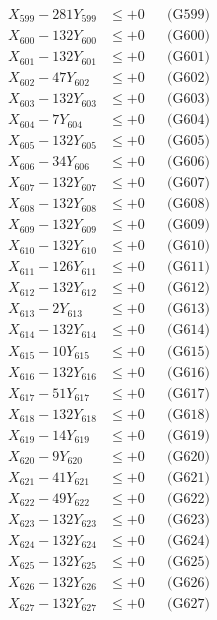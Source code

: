 \documentclass[a4paper,10pt]{article}
\begin{document}
{\begin{align}
X_{599} - 281Y_{599} &\leq +0 && \text{(G599)} \\
X_{600} - 132Y_{600} &\leq +0 && \text{(G600)} \\
\allowbreak
X_{601} - 132Y_{601} &\leq +0 && \text{(G601)} \\
X_{602} - 47Y_{602} &\leq +0 && \text{(G602)} \\
X_{603} - 132Y_{603} &\leq +0 && \text{(G603)} \\
X_{604} - 7Y_{604} &\leq +0 && \text{(G604)} \\
X_{605} - 132Y_{605} &\leq +0 && \text{(G605)} \\
X_{606} - 34Y_{606} &\leq +0 && \text{(G606)} \\
X_{607} - 132Y_{607} &\leq +0 && \text{(G607)} \\
X_{608} - 132Y_{608} &\leq +0 && \text{(G608)} \\
X_{609} - 132Y_{609} &\leq +0 && \text{(G609)} \\
X_{610} - 132Y_{610} &\leq +0 && \text{(G610)} \\
\allowbreak
X_{611} - 126Y_{611} &\leq +0 && \text{(G611)} \\
X_{612} - 132Y_{612} &\leq +0 && \text{(G612)} \\
X_{613} - 2Y_{613} &\leq +0 && \text{(G613)} \\
X_{614} - 132Y_{614} &\leq +0 && \text{(G614)} \\
X_{615} - 10Y_{615} &\leq +0 && \text{(G615)} \\
X_{616} - 132Y_{616} &\leq +0 && \text{(G616)} \\
X_{617} - 51Y_{617} &\leq +0 && \text{(G617)} \\
X_{618} - 132Y_{618} &\leq +0 && \text{(G618)} \\
X_{619} - 14Y_{619} &\leq +0 && \text{(G619)} \\
X_{620} - 9Y_{620} &\leq +0 && \text{(G620)} \\
\allowbreak
X_{621} - 41Y_{621} &\leq +0 && \text{(G621)} \\
X_{622} - 49Y_{622} &\leq +0 && \text{(G622)} \\
X_{623} - 132Y_{623} &\leq +0 && \text{(G623)} \\
X_{624} - 132Y_{624} &\leq +0 && \text{(G624)} \\
X_{625} - 132Y_{625} &\leq +0 && \text{(G625)} \\
X_{626} - 132Y_{626} &\leq +0 && \text{(G626)} \\
X_{627} - 132Y_{627} &\leq +0 && \text{(G627)} \\

\end{align}}
\end{document}
